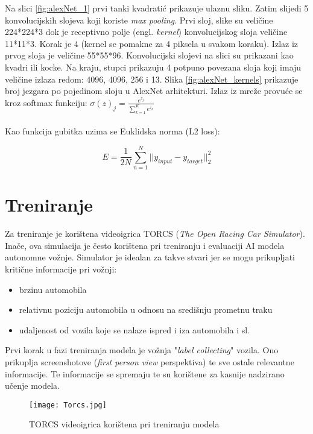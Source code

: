 \documentclass[seminar, utf8, numeric]{fer}
\begin{document}
Na slici \ref{fig:alexNet_1} prvi tanki kvadratić prikazuje ulaznu sliku. Zatim slijedi 5 konvolucijskih slojeva koji koriste \textit{max pooling}. Prvi sloj, slike su veličine 224*224*3 dok je receptivno polje (engl. \textit{kernel}) konvolucijskog sloja veličine 11*11*3. Korak je 4 (kernel se pomakne za 4 piksela u svakom koraku). Izlaz iz prvog sloja je veličine 55*55*96. Konvolucijski slojevi na slici su prikazani kao kvadri ili kocke. Na kraju, stupci prikazuju 4 potpuno povezana sloja koji imaju veličine izlaza redom: 4096, 4096, 256 i 13. Slika \ref{fig:alexNet_kernels} prikazuje broj jezgara po pojedinom sloju u AlexNet arhitekturi. Izlaz iz mreže provuće se kroz softmax funkciju: $\sigma(z)_j = \frac{e^{z_j}}{\sum_{k=1}^{K} e^{z_k}}$\\ \\
Kao funkcija gubitka uzima se Euklidska norma (L2 loss):

\begin{equation}
E = \frac{1}{2N}\sum_{n=1}^{N}||y_{input} - y_{target}||_2^2 
\end{equation}

\section{Treniranje}
Za treniranje je korištena videoigrica TORCS (\textit{The Open Racing
Car Simulator}). Inače, ova simulacija je često korištena pri treniranju i evaluaciji AI modela autonomne vožnje. Simulator je idealan za takve stvari jer se mogu prikupljati kritične informacije pri vožnji: 
\begin{itemize}
	\item{brzinu automobila}
	\item{relativnu poziciju automobila u odnosu na središnju prometnu traku}
	\item{udaljenost od vozila koje se nalaze ispred i iza automobila i sl.}
\end{itemize}
Prvi korak u fazi treniranja modela je vožnja "\textit{label collecting}" vozila. Ono prikuplja screenshotove (\textit{first person view} perspektiva) te sve ostale relevantne informacije. Te informacije se spremaju te su korištene za kasnije nadzirano učenje modela. 
 

\begin{figure}[h]
\centering
\texttt{[image: Torcs.jpg]}
\caption{TORCS videoigrica korištena pri treniranju modela}
\label{fig:torcs}
\end{figure}
\end{document}
